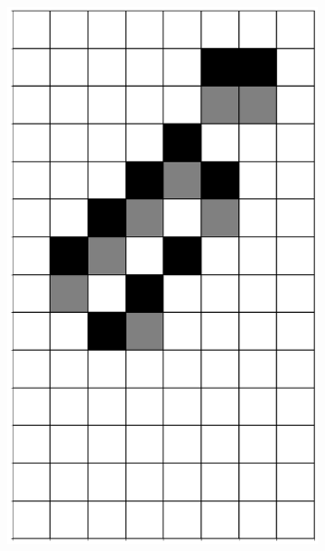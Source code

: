 \documentclass[12pt]{article}
\numberwithin{figure}{section} %
\begin{document}
\begin{figure}[H]
\begin{subfigure}{0.19\textwidth}
     \includegraphics[width=\linewidth]{Section4/17.4}
     \subcaption{}
   \end{subfigure}
      \newline
   \setcounter{subfigure}{0}
   \end{figure}
   
\end{document}
